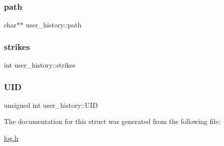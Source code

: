 \subsubsection{\texorpdfstring{path}{path}}
{\footnotesize\ttfamily char$\ast$$\ast$ user\+\_\+history\+::path}

\mbox{\label{structuser__history_ad90b0ce88a6a7ca1b89a3266c9f961f6_ad90b0ce88a6a7ca1b89a3266c9f961f6}} 
\subsubsection{\texorpdfstring{strikes}{strikes}}
{\footnotesize\ttfamily int user\+\_\+history\+::strikes}

\mbox{\label{structuser__history_ac06f0a0d7274aa206bda3dde0e8e8a9e_ac06f0a0d7274aa206bda3dde0e8e8a9e}} 
\subsubsection{\texorpdfstring{U\+ID}{UID}}
{\footnotesize\ttfamily unsigned int user\+\_\+history\+::\+U\+ID}



The documentation for this struct was generated from the following file\+:\begin{DoxyCompactItemize}
\item 
\hyperlink{log_8h}{log.\+h}\end{DoxyCompactItemize}
